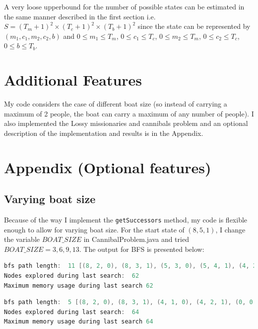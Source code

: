 \documentclass[9.5pt]{extarticle}
\begin{document}
A very loose upperbound for the number of possible states can be estimated in the same manner described in the first section i.e. $S = (T_m+1)^2 \times (T_c+1)^2 \times (T_b+1)^2$ since the state can be represented by  $(m_1,c_1,m_2,c_2,b)$ and $0\le m_1 \le T_m$,  $0\le c_1 \le T_c$,  $0\le m_2 \le T_m$,  $0\le c_2 \le T_c$,  $0\le b \le T_b$.

\section{Additional Features}

My code considers the case of different boat size (so instead of carrying a maximum of 2 people, the boat can carry a maximum of any number of people). I also implemented the Lossy missionaries and cannibals problem and an optional description of the implementation and results is in the Appendix.

\section{Appendix (Optional features)}
\subsection{Varying boat size}

Because of the way I implement the \verb`getSuccessors` method, my code is flexible enough to allow for varying boat size. For the start state of $(8,5,1)$, I change the variable $BOAT\_SIZE$ in CannibalProblem.java and tried $BOAT\_SIZE = 3, 6, 9, 13$. The output for BFS is presented below:\\

\begin{lstlisting}[language=java,caption={BFS for start state of (8,5,1) and BOAT\_SIZE = 3}]
bfs path length:  11 [(8, 2, 0), (8, 3, 1), (5, 3, 0), (5, 4, 1), (4, 2, 0), (4, 3, 1), (3, 1, 0), (3, 2, 1), (2, 0, 0), (2, 1, 1), (0, 0, 0)]
Nodes explored during last search:  62
Maximum memory usage during last search 62
\end{lstlisting}

\begin{lstlisting}[language=java,caption={BFS for start state of (8,5,1) and BOAT\_SIZE = 6}]
bfs path length:  5 [(8, 2, 0), (8, 3, 1), (4, 1, 0), (4, 2, 1), (0, 0, 0)]
Nodes explored during last search:  64
Maximum memory usage during last search 64
\end{lstlisting}
\end{document}
